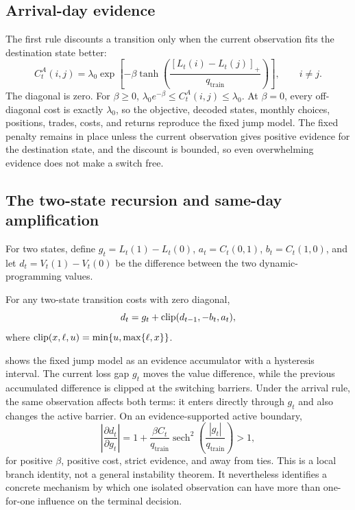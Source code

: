 \subsection{Arrival-day evidence}

The first rule discounts a transition only when the current observation fits the
destination state better:
\begin{equation}
C_t^{A}(i,j)=\lambda_0\exp\left[
-\beta\tanh\left(
\frac{[L_t(i)-L_t(j)]_+}{q_{\mathrm{train}}}
\right)\right],
\qquad i\neq j.
\label{eq:arrival}
\end{equation}
The diagonal is zero. For $\beta\geq 0$,
$\lambda_0 e^{-\beta}\leq C_t^A(i,j)\leq\lambda_0$. At $\beta=0$, every
off-diagonal cost is exactly $\lambda_0$, so the objective, decoded states,
monthly choices, positions, trades, costs, and returns reproduce the fixed jump
model. The fixed penalty remains in place unless the current observation gives
positive evidence for the destination state, and the discount is bounded, so even
overwhelming evidence does not make a switch free.

\subsection{The two-state recursion and same-day amplification}

For two states, define $g_t=L_t(1)-L_t(0)$, $a_t=C_t(0,1)$, $b_t=C_t(1,0)$, and
let $d_t=V_t(1)-V_t(0)$ be the difference between the two dynamic-programming
values.

\begin{proposition}
For any two-state transition costs with zero diagonal,
\begin{equation}
d_t=g_t+\operatorname{clip}(d_{t-1},-b_t,a_t),
\label{eq:binary}
\end{equation}
where $\operatorname{clip}(x,\ell,u)=\min\{u,\max\{\ell,x\}\}$.
\end{proposition}

 shows the fixed jump model as an evidence accumulator with a
hysteresis interval. The current loss gap $g_t$ moves the value difference, while
the previous accumulated difference is clipped at the switching barriers. Under
the arrival rule, the same observation affects both terms: it enters directly
through $g_t$ and also changes the active barrier. On an evidence-supported active
boundary,
\begin{equation}
\left|\frac{\partial d_t}{\partial g_t}\right|
=1+\frac{\beta C_t}{q_{\mathrm{train}}}
\operatorname{sech}^2\!\left(\frac{|g_t|}{q_{\mathrm{train}}}\right)>1,
\label{eq:amplification}
\end{equation}
for positive $\beta$, positive cost, strict evidence, and away from ties. This is
a local branch identity, not a general instability theorem. It nevertheless
identifies a concrete mechanism by which one isolated observation can have more
than one-for-one influence on the terminal decision.

